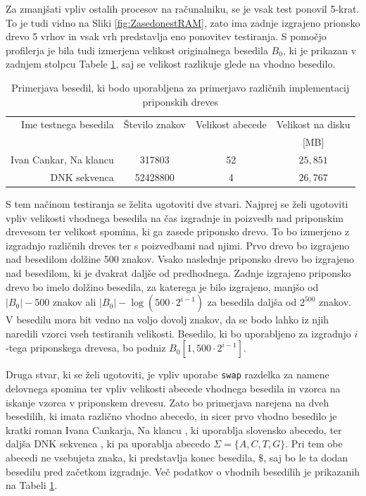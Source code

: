 Za zmanjšati vpliv ostalih procesov na računalniku, se je vsak test ponovil 5-krat. To je tudi vidno na Sliki \ref{fig:ZasedonestRAM}, zato ima zadnje izgrajeno prionsko drevo 5 vrhov in vsak vrh predstavlja eno ponovitev testiranja. S pomočjo profilerja je bila tudi izmerjena velikost originalnega besedila $B_0$, ki je prikazan v zadnjem stolpcu Tabele \ref{tab:besedila}, saj se velikost razlikuje glede na vhodno besedilo.

\begin{table}[htb]
    \caption{Primerjava besedil, ki bodo uporabljena za primerjavo različnih implementacij priponskih dreves}
    \label{tab:besedila}
    \centering
    \begin{tabular}{rccc}
        Ime testnega besedila& Število znakov & Velikost abecede & Velikost na disku \\
        &  &   & [MB]\\
         \hline
        Ivan Cankar, Na klancu \cite{podatkiNaKlancu}& 317803 & 52 & $25,851$ \\
        DNK sekvenca \cite{podatki}&  52428800& 4 & $26,767$ \\
    \end{tabular}
    
\end{table}

S tem načinom testiranja se želita ugotoviti dve stvari. Najprej se želi ugotoviti vpliv velikosti vhodnega besedila na čas izgradnje in poizvedb nad priponskim drevesom ter velikost spomina, ki ga zasede priponsko drevo. To bo izmerjeno z izgradnjo različnih dreves ter s poizvedbami nad njimi. Prvo drevo bo izgrajeno nad besedilom dolžine 500 znakov. Vsako naslednje priponsko drevo bo izgrajeno nad besedilom, ki je dvakrat daljše od predhodnega. Zadnje izgrajeno priponsko drevo bo imelo dolžino besedila, za katerega je bilo izgrajeno, manjšo od $|B_0|-500$ znakov ali $|B_0|-\log{(500\cdot2^{i-1})}$ za besedila daljša od $2^{500}$ znakov. V besedilu mora bit vedno na voljo dovolj znakov, da se bodo lahko iz njih naredili vzorci vseh testiranih velikosti. Besedilo, ki bo uporabljeno za izgradnjo $i$-tega priponskega drevesa, bo podniz $B_0[1,500\cdot2^{i-1}]$.

 Druga stvar, ki se želi ugotoviti, je vpliv uporabe \verb|swap| razdelka za namene delovnega spomina ter vpliv velikosti abecede vhodnega besedila in vzorca na iskanje vzorca v priponskem drevesu. Zato bo primerjava narejena na dveh besedilih, ki imata različno vhodno abecedo, in sicer prvo vhodno besedilo je kratki roman Ivana Cankarja, Na klancu \cite{podatkiNaKlancu}, ki uporablja slovensko abecedo, ter daljša DNK sekvenca \cite{podatki}, ki pa uporablja abecedo $\Sigma = \{A,C,T,G\}$. Pri tem obe abecedi ne vsebujeta znaka, ki predstavlja konec besedila, $\$$, saj bo le ta dodan besedilu pred začetkom izgradnje. Več podatkov o vhodnih besedilih je prikazanih na Tabeli \ref{tab:besedila}.


